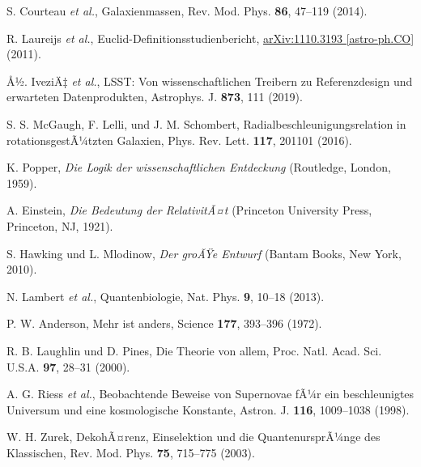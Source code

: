 ﻿\documentclass[twocolumn,aps,prl]{revtex4-2}
\begin{document}
{{{{{{{{{{{{{{{{\begin{thebibliography}{99}
																				 S. Courteau \textit{et al.}, Galaxienmassen, Rev. Mod. Phys. \textbf{86}, 47--119 (2014).
																				
																				 R. Laureijs \textit{et al.}, Euclid-Definitionsstudienbericht, \href{https://arxiv.org/abs/1110.3193}{arXiv:1110.3193 [astro-ph.CO]} (2011).
																				
																				 Å½. IveziÄ‡ \textit{et al.}, LSST: Von wissenschaftlichen Treibern zu Referenzdesign und erwarteten Datenprodukten, Astrophys. J. \textbf{873}, 111 (2019).
																				
																				 S. S. McGaugh, F. Lelli, und J. M. Schombert, Radialbeschleunigungsrelation in rotationsgestÃ¼tzten Galaxien, Phys. Rev. Lett. \textbf{117}, 201101 (2016).
																				
																				 K. Popper, \textit{Die Logik der wissenschaftlichen Entdeckung} (Routledge, London, 1959).
																				
																				 A. Einstein, \textit{Die Bedeutung der RelativitÃ¤t} (Princeton University Press, Princeton, NJ, 1921).
																				
																				 S. Hawking und L. Mlodinow, \textit{Der groÃŸe Entwurf} (Bantam Books, New York, 2010).
																				
																				 N. Lambert \textit{et al.}, Quantenbiologie, Nat. Phys. \textbf{9}, 10--18 (2013).
																				
																				 P. W. Anderson, Mehr ist anders, Science \textbf{177}, 393--396 (1972).
																				
																				 R. B. Laughlin und D. Pines, Die Theorie von allem, Proc. Natl. Acad. Sci. U.S.A. \textbf{97}, 28--31 (2000).
																				
																				 A. G. Riess \textit{et al.}, Beobachtende Beweise von Supernovae fÃ¼r ein beschleunigtes Universum und eine kosmologische Konstante, Astron. J. \textbf{116}, 1009--1038 (1998).
																				
																				 W. H. Zurek, DekohÃ¤renz, Einselektion und die QuantenursprÃ¼nge des Klassischen, Rev. Mod. Phys. \textbf{75}, 715--775 (2003).
																				

\end{thebibliography}}}}}}}}}}}}}}}}}
\end{document}
